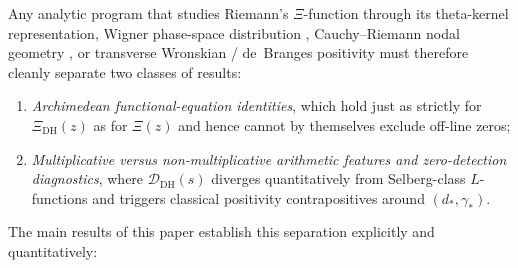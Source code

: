 \documentclass[11pt,reqno]{amsart}
\theoremstyle{definition}
\theoremstyle{remark}
\numberwithin{equation}{section}
\begin{document}
Any analytic program that studies Riemann's $\Xi$-function \cite{riemann1859} through its theta-kernel representation, Wigner phase-space distribution \cite{wigner1932,hudson1974}, Cauchy--Riemann nodal geometry \cite{speiser1934,ariasdereyna2003}, or transverse Wronskian / de~Branges positivity \cite{debranges1968,hinkkanen1997,lagarias1999} must therefore cleanly separate two classes of results:
\begin{enumerate}[label=(\alph*),leftmargin=2.2em]
  \item \emph{Archimedean functional-equation identities}, which hold just as strictly for $\Xi_{\mathrm{DH}}(z)$ as for $\Xi(z)$ and hence cannot by themselves exclude off-line zeros;
  \item \emph{Multiplicative versus non-multiplicative arithmetic features and zero-detection diagnostics}, where $\mathcal{D}_{\mathrm{DH}}(s)$ diverges quantitatively from Selberg-class $L$-functions \cite{selberg1992,kaczorowski1999} and triggers classical positivity contrapositives around $(d_*,\gamma_*)$.
\end{enumerate}

The main results of this paper establish this separation explicitly and quantitatively:
\end{document}
